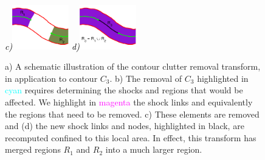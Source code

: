 \begin{figure}[!ht]
{\footnotesize\textit{\textcolor{black}{c)}}}\includegraphics[width=0.22\textwidth]{figs/lsc_l7.pdf}
{\footnotesize\textit{\textcolor{black}{d)}}}\includegraphics[width=0.22\textwidth]{figs/lsc_l8.pdf}
\caption{a) A schematic illustration of the contour clutter removal transform, in application to contour $C_3$. b) The removal of $C_3$ highlighted in \textcolor{cyan}{cyan} requires determining the shocks and regions that would be affected. We highlight in \textcolor{magenta}{magenta} the shock links and equivalently the regions that need to be removed. c) These elements are removed and (d) the new shock links and nodes, highlighted in black, are recomputed confined to this local area. In effect, this transform has merged regions $R_1$ and $R_2$ into a much larger region.}
\label{fig:lc_steps_l1}
\end{figure}


